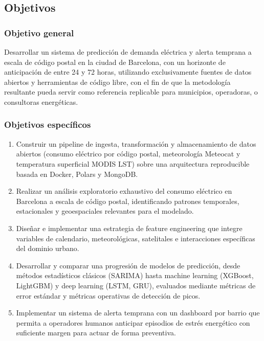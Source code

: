 \documentclass[12pt, a4paper]{article}
\begin{document}
\subsection{Objetivos}

\subsubsection{Objetivo general}

Desarrollar un sistema de predicción de demanda eléctrica y alerta temprana a escala de código postal en la ciudad de Barcelona, con un horizonte de anticipación de entre 24 y 72 horas, utilizando exclusivamente fuentes de datos abiertos y herramientas de código libre, con el fin de que la metodología resultante pueda servir como referencia replicable para municipios, operadoras,  o consultoras energéticas.

\subsubsection{Objetivos específicos}

\begin{enumerate}[label=\arabic*.]
    \item Construir un pipeline de ingesta, transformación y almacenamiento de datos abiertos (consumo eléctrico por código postal, meteorología Meteocat y temperatura superficial MODIS LST) sobre una arquitectura reproducible basada en Docker, Polars y MongoDB.
    \item Realizar un análisis exploratorio exhaustivo del consumo eléctrico en Barcelona a escala de código postal, identificando patrones temporales, estacionales y geoespaciales relevantes para el modelado.
    \item Diseñar e implementar una estrategia de feature engineering que integre variables de calendario, meteorológicas, satelitales e interacciones específicas del dominio urbano.
    \item Desarrollar y comparar una progresión de modelos de predicción, desde métodos estadísticos clásicos (SARIMA) hasta machine learning (XGBoost, LightGBM) y deep learning (LSTM, GRU), evaluados mediante métricas de error estándar y métricas operativas de detección de picos.
    \item Implementar un sistema de alerta temprana con un dashboard por barrio que permita a operadores humanos anticipar episodios de estrés energético con suficiente margen para actuar de forma preventiva.
\end{enumerate}
\end{document}
